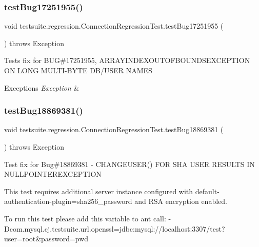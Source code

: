 \subsubsection{\texorpdfstring{test\+Bug17251955()}{testBug17251955()}}
{\footnotesize\ttfamily void testsuite.\+regression.\+Connection\+Regression\+Test.\+test\+Bug17251955 (\begin{DoxyParamCaption}{ }\end{DoxyParamCaption}) throws Exception}

Tests fix for B\+UG\#17251955, A\+R\+R\+A\+Y\+I\+N\+D\+E\+X\+O\+U\+T\+O\+F\+B\+O\+U\+N\+D\+S\+E\+X\+C\+E\+P\+T\+I\+ON ON L\+O\+NG M\+U\+L\+T\+I-\/\+B\+Y\+TE D\+B/\+U\+S\+ER N\+A\+M\+ES


\begin{DoxyExceptions}{Exceptions}
{\em Exception} & \\
\hline
\end{DoxyExceptions}
\mbox{\label{classtestsuite_1_1regression_1_1_connection_regression_test_a3a33e5e8b287fe162fdfc5ae872b7b4b}} 
\subsubsection{\texorpdfstring{test\+Bug18869381()}{testBug18869381()}}
{\footnotesize\ttfamily void testsuite.\+regression.\+Connection\+Regression\+Test.\+test\+Bug18869381 (\begin{DoxyParamCaption}{ }\end{DoxyParamCaption}) throws Exception}

Test fix for Bug\#18869381 -\/ C\+H\+A\+N\+G\+E\+U\+S\+E\+R() F\+OR S\+HA U\+S\+ER R\+E\+S\+U\+L\+TS IN N\+U\+L\+L\+P\+O\+I\+N\+T\+E\+R\+E\+X\+C\+E\+P\+T\+I\+ON

This test requires additional server instance configured with default-\/authentication-\/plugin=sha256\+\_\+password and R\+SA encryption enabled.

To run this test please add this variable to ant call\+: -\/\+Dcom.\+mysql.\+cj.\+testsuite.\+url.\+openssl=jdbc\+:mysql\+://localhost\+:3307/test?user=root\&password=pwd


